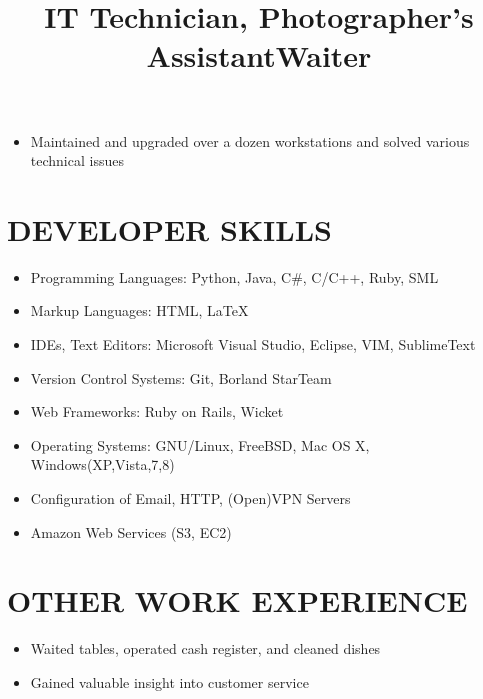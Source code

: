 \documentclass[line, overlapped]{res}
\begin{document}
\begin{resume}
    \title{IT Technician, Photographer's Assistant}
    \begin{position}
        \begin{itemize}
            \item Maintained and upgraded over a dozen workstations and solved various technical issues
        \end{itemize}
    \end{position}


	\section{DEVELOPER SKILLS}

	\begin{itemize}[leftmargin=10pt]
		\item Programming Languages:  Python, Java, C\#, C/C++, Ruby, SML
        \item Markup Languages:  HTML, \LaTeX
        \item IDEs, Text Editors:  Microsoft Visual Studio, Eclipse, VIM, SublimeText
        \item Version Control Systems:  Git, Borland StarTeam
        \item Web Frameworks:  Ruby on Rails, Wicket
	    \item Operating Systems:  GNU/Linux, FreeBSD, Mac OS X, Windows(XP,Vista,7,8)
	    \item Configuration of Email, HTTP, (Open)VPN Servers
        \item Amazon Web Services (S3, EC2)
	\end{itemize}


	\section{OTHER WORK EXPERIENCE}
	
    \title{Waiter}
    \begin{position}
        \begin{itemize}
            \item Waited tables, operated cash register, and cleaned dishes
            \item Gained valuable insight into customer service
        \end{itemize}
    \end{position}


\end{resume}
\end{document}
